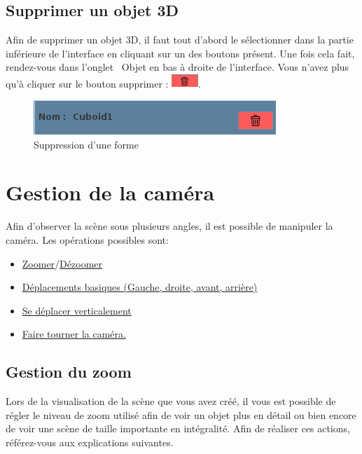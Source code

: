 \documentclass[11pt]{report}
\begin{document}
\section{Supprimer un objet 3D}

Afin de supprimer un objet 3D, il faut tout d'abord le sélectionner dans la partie inférieure de l'interface en cliquant sur un des boutons
présent. Une fois cela fait, rendez-vous dans l'onglet \flqq\ Objet \frqq en bas à droite de l'interface. Vous n'avez plus qu'à cliquer sur le
bouton supprimer : \includegraphics[width=1cm]{./btn_supprimer.png}.

\begin{figure}[h]
  \centering
  \includegraphics{./supprimerForme.png}
  \caption{Suppression d'une forme}
\end{figure}

\chapter{Gestion de la caméra}


Afin d'observer la scène sous plusieurs angles, il est possible de manipuler la caméra. Les opérations possibles sont:
\begin{itemize}
        \item \hyperlink{zoom}{Zoomer}/\hyperlink{dezoom}{Dézoomer}
        \item \hyperlink{move}{Déplacements basiques (Gauche, droite, avant, arrière)}
        \item \hyperlink{moveV}{Se déplacer verticalement}
        \item \hyperlink{rotate}{Faire tourner la caméra.}
\end{itemize}

\section{Gestion du zoom}

Lors de la visualisation de la scène que vous avez créé, il vous est possible de régler le niveau de zoom utilisé afin de voir un objet plus en détail ou bien encore de voir une scène de taille importante en intégralité. Afin de réaliser ces actions, référez-vous aux explications suivantes.
\end{document}
